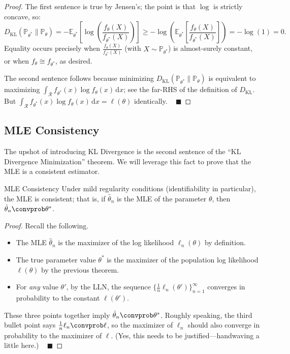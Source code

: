 \begin{proof}
    The first sentence is true by Jensen's; the point is that $\log$ is strictly concave, so:
    \[ D_{\mathrm{KL}}(\mathbb{P}_{\theta^*} \parallel \mathbb{P}_{\theta})
    = -\mathbb{E}_{\theta^*} \left[ \log \left(\frac{f_{\theta}(X)}{f_{\theta^*}(X)}\right) \right]
    \geq -\log \left( \mathbb{E}_{\theta^*} \left[ \frac{f_{\theta}(X)}{f_{\theta^*}(X)} \right] \right)
    = -\log(1) = 0. \]
    Equality occurs precisely when $\frac{f_{\theta}(X)}{f_{\theta^*}(X)}$
    (with $X \sim \mathbb{P}_{\theta^*}$) is almost-surely constant,
    or when $f_{\theta} \cong f_{\theta^*}$, as desired.

    The second sentence follows because minimizing
    $D_{\mathrm{KL}}(\mathbb{P}_{\theta^*} \parallel \mathbb{P}_{\theta})$
    is equivalent to maximizing
    $\int_{\mathcal{R}} f_{\theta^*}(x) \log f_{\theta}(x) \, \mathrm{d}x$;
    see the far-RHS of the definition of $D_{\mathrm{KL}}$.
    But $\int_{\mathcal{R}} f_{\theta^*}(x) \log f_{\theta}(x) \, \mathrm{d}x = \ell(\theta)$
    identically. ~ $\blacksquare$
\end{proof}

\subsection{MLE Consistency}

The upshot of introducing KL Divergence is the second sentence of the
``KL Divergence Minimization'' theorem.
We will leverage this fact to prove that the MLE is a consistent estimator.

\begin{theorem}{MLE Consistency}
    Under mild regularity conditions (identifiability in particular),
    the MLE is consistent; that is, if $\hat{\theta}_n$ is the MLE of the parameter $\theta$,
    then $\hat{\theta}_n \convprob \theta^*$.
\end{theorem}

\begin{proof}
    Recall the following.
    \begin{itemize}
        \item The MLE $\hat{\theta}_n$ is
        the maximizer of the log likelihood $\ell_n(\theta)$ by definition.
        \item The true parameter value $\theta^*$ is
        the maximizer of the population log likelihood $\ell(\theta)$
        by the previous theorem.
        \item For \emph{any} value $\theta'$,
        by the LLN, the sequence $\{\frac{1}{n}\ell_n(\theta')\}_{n = 1}^{\infty}$
        converges in probability to the constant $\ell(\theta')$.
    \end{itemize}
    These three points together imply $\hat{\theta}_n \convprob \theta^*$.
    Roughly speaking, the third bullet point says $\frac{1}{n}\ell_n \convprob \ell$,
    so the maximizer of $\ell_n$ should also converge in probability
    to the maximizer of $\ell$.
    (Yes, this needs to be justified---handwaving a little here.) ~ $\blacksquare$
\end{proof}

